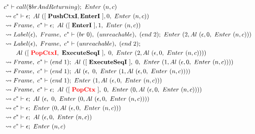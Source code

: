  \\
\begin{align}
  &c^* \vdash call(\$brAndReturning); ~ Enter ~ (n, c)
  \label{eq:resolve-1} \\
  &\leadsto c^* \vdash \epsilon; ~ Al ~ ([ ~ \textbf{PushCtxI}, \textbf{EnterI} ~ ], 0, ~ Enter ~ (n, c))
  \label{eq:resolve-2} \\
  &\leadsto Frame, ~ c^* \vdash \epsilon; ~ Al ~ ([ ~ \textbf{EnterI} ~ ], 1, ~ Enter ~ (n, c))
  \label{eq:resolve-3} \\
  &\leadsto Label(\epsilon), ~ Frame, ~ c^* \vdash (br ~ 0), ~ (unreachable), ~ (end ~ 2); ~
    Enter ~ (2, Al ~ (\epsilon, 0, ~ Enter ~ (n, c)))
  \label{eq:resolve-4} \\
  &\leadsto Label(\epsilon), ~ Frame, ~ c^* \vdash (unreachable), ~ (end ~ 2); \\
  &\quad\quad Al ~ ([ ~ \textcolor{red}{\textbf{PopCtxI}}, ~ \textbf{ExecuteSeqI} ~ ], ~ 0, ~ Enter ~ (2, Al ~ (\epsilon, 0, ~ Enter ~ (n, c))))
  \label{eq:resolve-5} \\
  &\leadsto Frame, ~ c^* \vdash (end ~ 1); ~
    Al ~ ([ ~ \textbf{ExecuteSeqI} ~ ], ~ 0, ~ Enter ~ (1, Al ~ (\epsilon, 0, ~ Enter ~ (n, c))))
  \label{eq:resolve-6} \\
  &\leadsto Frame, ~ c^* \vdash (end ~ 1); ~
    Al ~ (\epsilon, ~ 0, ~ Enter ~ (1, Al ~ (\epsilon, 0, ~ Enter ~ (n, c))))
  \label{eq:resolve-7} \\
  &\leadsto Frame, ~ c^* \vdash (end ~ 1); ~ Enter ~ (1, Al ~ (\epsilon, 0, ~ Enter ~ (n, c)))
  \label{eq:resolve-8} \\
  &\leadsto Frame, ~ c^* \vdash \epsilon; ~
    Al ~ ([ ~ \textcolor{red}{\textbf{PopCtx}} ~ ], ~ 0, ~ Enter ~ (0, Al ~ (\epsilon, 0, ~ Enter ~ (n, c))))
  \label{eq:resolve-9} \\
  &\leadsto c^* \vdash \epsilon; ~
    Al ~ (\epsilon, ~ 0, ~ Enter ~ (0, Al ~ (\epsilon, 0, ~ Enter ~ (n, c))))
  \label{eq:resolve-10} \\
  &\leadsto c^* \vdash \epsilon; ~ Enter ~ (0, Al ~ (\epsilon, 0, ~ Enter ~ (n, c)))
  \label{eq:resolve-11} \\
  &\leadsto c^* \vdash \epsilon; ~ Al ~ (\epsilon, 0, ~ Enter ~ (n, c))
  \label{eq:resolve-12} \\
  &\leadsto c^* \vdash \epsilon; ~ Enter ~ (n, c)
  \label{eq:resolve-13}
\end{align}
